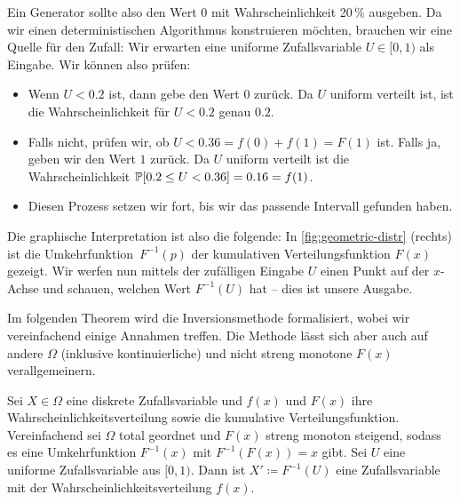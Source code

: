 Ein Generator sollte also \zB den Wert $0$ mit Wahrscheinlichkeit 20\,\% ausgeben.
Da wir einen deterministischen Algorithmus konstruieren möchten, brauchen wir eine Quelle für den Zufall:
Wir erwarten eine uniforme Zufallsvariable $U \in [0, 1)$ als Eingabe.
Wir können also \zB prüfen:
\begin{itemize}
    \item Wenn $U < 0.2$ ist, dann gebe den Wert $0$ zurück.
          Da $U$ uniform verteilt ist, ist die Wahrscheinlichkeit für $U < 0.2$ genau $0.2$.

    \item Falls nicht, prüfen wir, ob $U < 0.36 = f(0) + f(1) = F(1)$ ist. Falls ja, geben wir den Wert $1$ zurück.
Da $U$ uniform verteilt ist die Wahrscheinlichkeit $\mathbb{P}\!\left[0.2 \le U < 0.36\right] = 0.16 = f(1)$.

    \item Diesen Prozess setzen wir fort, bis wir das passende Intervall gefunden haben.
\end{itemize}

Die graphische Interpretation ist also die folgende:
In \cref{fig:geometric-distr} (rechts) ist die Umkehrfunktion~$F^{-1}(p)$ der kumulativen Verteilungsfunktion $F(x)$ gezeigt.
Wir werfen nun mittels der zufälligen Eingabe $U$ einen Punkt auf der $x$-Achse und schauen, welchen Wert $F^{-1}(U)$ hat -- dies ist unsere Ausgabe.

Im folgenden Theorem wird die Inversionsmethode formalisiert, wobei wir vereinfachend einige Annahmen treffen.
Die Methode lässt sich aber auch auf andere $\Omega$ (inklusive kontinuierliche) und nicht streng monotone $F(x)$ verallgemeinern.

\begin{theorem}
    Sei $X \in \Omega$ eine diskrete Zufallsvariable und $f(x)$ und $F(x)$ ihre Wahrscheinlichkeitsverteilung sowie die kumulative Verteilungsfunktion.
    Vereinfachend sei $\Omega$ total geordnet und $F(x)$ streng monoton steigend, sodass es eine Umkehrfunktion $F^{-1}(x)$ mit $F^{-1}(F(x)) = x$ gibt.
    Sei $U$ eine uniforme Zufallsvariable aus $[0, 1)$.
    Dann ist $X' \coloneqq F^{-1}(U)$ eine Zufallsvariable mit der Wahrscheinlichkeitsverteilung $f(x)$.
\end{theorem}

